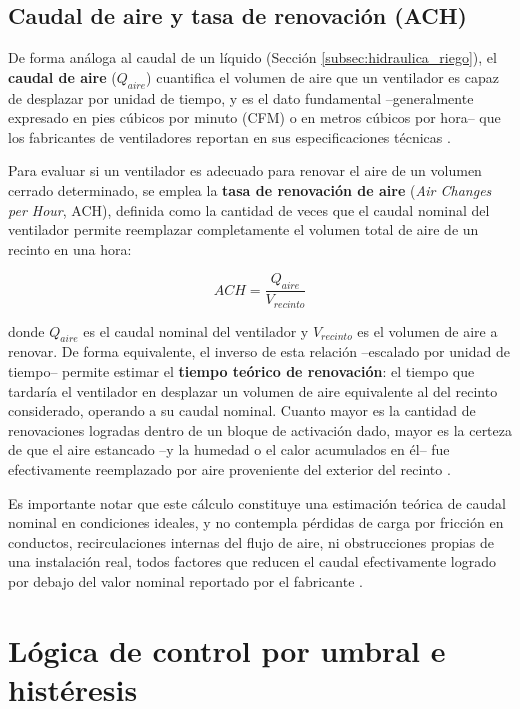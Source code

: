 \subsection{Caudal de aire y tasa de renovación (ACH)}
\label{subsec:caudal_aire_ach}

De forma análoga al caudal de un líquido (Sección \ref{subsec:hidraulica_riego}), el \textbf{caudal de aire} ($Q_{aire}$) cuantifica el volumen de aire que un ventilador es capaz de desplazar por unidad de tiempo, y es el dato fundamental --generalmente expresado en pies cúbicos por minuto (CFM) o en metros cúbicos por hora-- que los fabricantes de ventiladores reportan en sus especificaciones técnicas \cite{bucklin2019greenhouse}.

Para evaluar si un ventilador es adecuado para renovar el aire de un volumen cerrado determinado, se emplea la \textbf{tasa de renovación de aire} (\textit{Air Changes per Hour}, ACH), definida como la cantidad de veces que el caudal nominal del ventilador permite reemplazar completamente el volumen total de aire de un recinto en una hora:

\begin{equation}
    ACH = \frac{Q_{aire}}{V_{recinto}}
    \label{eq:ach}
\end{equation}

\noindent donde $Q_{aire}$ es el caudal nominal del ventilador y $V_{recinto}$ es el volumen de aire a renovar. De forma equivalente, el inverso de esta relación --escalado por unidad de tiempo-- permite estimar el \textbf{tiempo teórico de renovación}: el tiempo que tardaría el ventilador en desplazar un volumen de aire equivalente al del recinto considerado, operando a su caudal nominal. Cuanto mayor es la cantidad de renovaciones logradas dentro de un bloque de activación dado, mayor es la certeza de que el aire estancado --y la humedad o el calor acumulados en él-- fue efectivamente reemplazado por aire proveniente del exterior del recinto \cite{bucklin2019greenhouse}.

Es importante notar que este cálculo constituye una estimación teórica de caudal nominal en condiciones ideales, y no contempla pérdidas de carga por fricción en conductos, recirculaciones internas del flujo de aire, ni obstrucciones propias de una instalación real, todos factores que reducen el caudal efectivamente logrado por debajo del valor nominal reportado por el fabricante \cite{bucklin2019greenhouse}.
\section{Lógica de control por umbral e histéresis}
\label{sec:control_histeresis}

